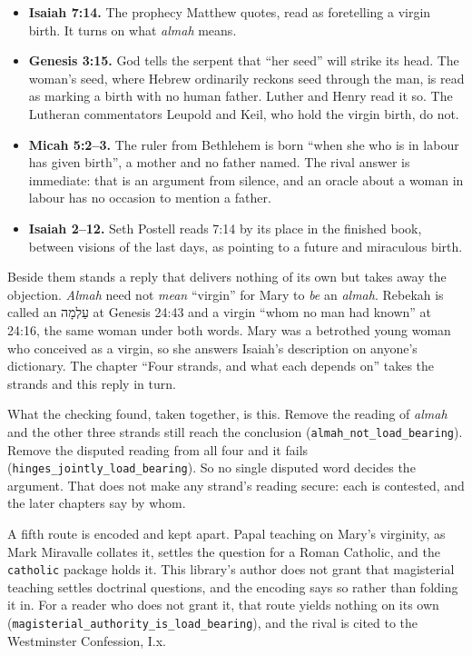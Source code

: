 \documentclass[11pt]{article}
\begin{document}
\begin{itemize}
  \item \textbf{Isaiah 7:14.} The prophecy Matthew quotes, read as foretelling a virgin birth. It turns on what \emph{almah} means.
  \item \textbf{Genesis 3:15.} God tells the serpent that “her seed” will strike its head. The woman’s seed, where Hebrew ordinarily reckons seed through the man, is read as marking a birth with no human father. Luther and Henry read it so. The Lutheran commentators Leupold and Keil, who hold the virgin birth, do not.
  \item \textbf{Micah 5:2–3.} The ruler from Bethlehem is born “when she who is in labour has given birth”, a mother and no father named. The rival answer is immediate: that is an argument from silence, and an oracle about a woman in labour has no occasion to mention a father.
  \item \textbf{Isaiah 2–12.} Seth Postell reads 7:14 by its place in the finished book, between visions of the last days, as pointing to a future and miraculous birth.
\end{itemize}
Beside them stands a reply that delivers nothing of its own but takes away the objection. \emph{Almah} need not \emph{mean} “virgin” for Mary to \emph{be} an \emph{almah}. Rebekah is called an עַלְמָה at Genesis 24:43 and a virgin “whom no man had known” at 24:16, the same woman under both words. Mary was a betrothed young woman who conceived as a virgin, so she answers Isaiah’s description on anyone’s dictionary. The chapter “Four strands, and what each depends on” takes the strands and this reply in turn.

What the checking found, taken together, is this. Remove the reading of \emph{almah} and the other three strands still reach the conclusion (\texttt{almah\_\allowbreak{}not\_\allowbreak{}load\_\allowbreak{}bearing}). Remove the disputed reading from all four and it fails (\texttt{hinges\_\allowbreak{}jointly\_\allowbreak{}load\_\allowbreak{}bearing}). So no single disputed word decides the argument. That does not make any strand’s reading secure: each is contested, and the later chapters say by whom.

A fifth route is encoded and kept apart. Papal teaching on Mary’s virginity, as Mark Miravalle collates it, settles the question for a Roman Catholic, and the \texttt{catholic} package holds it. This library’s author does not grant that magisterial teaching settles doctrinal questions, and the encoding says so rather than folding it in. For a reader who does not grant it, that route yields nothing on its own (\texttt{magisterial\_\allowbreak{}authority\_\allowbreak{}is\_\allowbreak{}load\_\allowbreak{}bearing}), and the rival is cited to the Westminster Confession, I.x.
\end{document}
